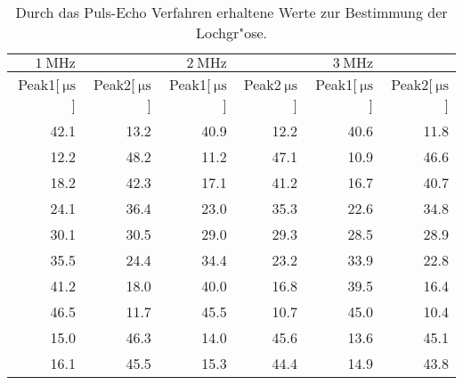 
\begin{table}[!h]
\begin{center}
\begin{tabular}{|r|r|r|r|r|r|}
\hline
 $\SI{1}{\mega\hertz}$ && $\SI{2}{\mega\hertz}$ && $\SI{3}{\mega\hertz}$&\\
\hline
Peak1[$\SI{}{\micro\second}$] & Peak2[$\SI{}{\micro\second}$] & Peak1[$\SI{}{\micro\second}$] & Peak2$\SI{}{\micro\second}$] & Peak1[$\SI{}{\micro\second}$] & Peak2[$\SI{}{\micro\second}$]\\
\hline
\hline
42.1 &	13.2 &	40.9 &	12.2 &	40.6 &	11.8\\
12.2 &	48.2 &	11.2 &	47.1 &	10.9 &	46.6\\
18.2 &	42.3 &	17.1 &	41.2 &	16.7 &	40.7\\
24.1 &	36.4 &	23.0 &	35.3 &	22.6 &	34.8\\
30.1 &	30.5 &	29.0 &	29.3 &	28.5 &	28.9\\
35.5 &	24.4 &	34.4 &	23.2 &	33.9 &	22.8\\
41.2 &	18.0 &	40.0 &	16.8 &	39.5 &	16.4\\
46.5 &	11.7 &	45.5 &	10.7 &	45.0 &	10.4\\
15.0 &	46.3 &	14.0 &	45.6 &	13.6 &	45.1\\
16.1 &	45.5 &	15.3 &	44.4 &	14.9 &	43.8\\
\hline
\end{tabular}
\caption[]{Durch das Puls-Echo Verfahren erhaltene Werte zur Bestimmung der Lochgr"ose.}
\label{loch1}
\end{center}
\end{table}